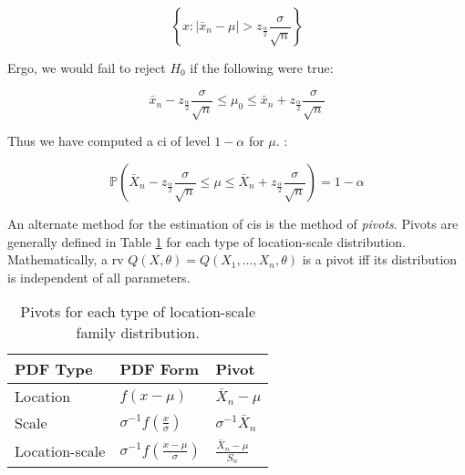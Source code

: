 \documentclass{report}
\renewcommand{\arraystretch}{1.5}
\begin{document}
\begin{equation}\label{eq:normal-hypothesis-test-rejection-region}
    \left\{x \colon |\bar{x}_n - \mu| > z_{\frac{\alpha}{2}} \frac{\sigma}{\sqrt{n}}\right\}
\end{equation}

Ergo, we would fail to reject $H_0$ if the following were true:

\begin{equation}\label{eq:normal-hypothesis-test-acceptance-region}
    \bar{x}_n - z_{\frac{\alpha}{2}} \frac{\sigma}{\sqrt{n}} \leq \mu_0 \leq \bar{x}_n + z_{\frac{\alpha}{2}} \frac{\sigma}{\sqrt{n}}
\end{equation}

Thus we have computed a \gls{ci} of level $1 - \alpha$ for $\mu$. :

\begin{equation}\label{eq:normal-hypothesis-ttest-acceptance-probability}
    \mathbb{P}\left(\bar{X}_n - z_{\frac{\alpha}{2}} \frac{\sigma}{\sqrt{n}} \leq \mu \leq \bar{X}_n + z_{\frac{\alpha}{2}} \frac{\sigma}{\sqrt{n}}\right) = 1 - \alpha 
\end{equation}

An alternate method for the estimation of \glspl{ci} is the method of \textit{pivots}. Pivots are generally defined in Table \ref{table:distribution-pivots} for each type of location-scale distribution. Mathematically, a \gls{rv} $Q(X, \theta) = Q(X_1, \dots, X_n, \theta)$ is a pivot \gls{iff} its distribution is independent of all parameters.

\renewcommand{\arraystretch}{2}

\begin{table}[h!]
\centering
\begin{tabular}{||l l l||} 
 \hline
 \textbf{PDF Type} & \textbf{PDF Form} & \textbf{Pivot} \\ [0.5ex] 
  \hline\hline
  Location & $f(x - \mu)$ & $\bar{X}_n - \mu$ \\
  \hline 
  Scale & $\sigma^{-1} f \left(\frac{x}{\sigma}\right)$ & $\sigma^{-1}\bar{X}_n$ \\
  \hline 
  Location-scale & $\sigma^{-1} f\left(\frac{x - \mu}{\sigma}\right)$ & $\frac{\bar{X}_n - \mu}{S_n}$ \\
  \hline 
\end{tabular}
\caption{Pivots for each type of location-scale family distribution.}
\label{table:distribution-pivots}
\end{table}
\end{document}
